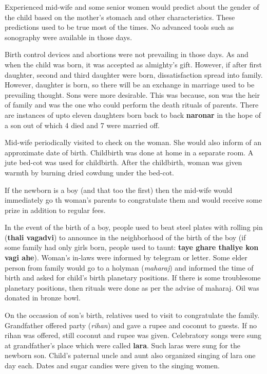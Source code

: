 Experienced mid-wife and some senior women would predict about the gender of the
child based on the mother's stomach and other characteristics. These
predictions used to be true most of the times. No advanced tools such as
sonography were available in those days.

Birth control devices and abortions were not prevailing in those days. As and
when the child was born, it was accepted as almighty's gift. However, if after
first daughter, second and third daughter were born, dissatisfaction spread
into family. However, daughter is born, so there will be an exchange in
marriage used to be prevailing thought. Sons were more desirable. This was
because, son was the heir of family and was the one who could perform the death
rituals of parents. There are instances of upto eleven daughters born back to
back \textbf{naronar} in the hope of a son out of which 4 died and 7 were married off.

Mid-wife periodically visited to check on the woman. She would also inform of an
approximate date of birth. Childbirth was done at home in a separate room. A
jute bed-cot was used for childbirth. After the childbirth, woman was given
warmth by burning dried cowdung under the bed-cot.

If the newborn is a boy (and that too the first) then the mid-wife would
immediately go th woman's parents to congratulate them and would receive some
prize in addition to regular fees.

In the event of the birth of a boy, people used to beat steel plates with
rolling pin (\textbf{thali vagadvi}) to announce in the neighborhood of the
birth of the boy (if some family had only girls born, people used to taunt:
\textbf{taye ghare thaliye kon vagi ahe}). Woman's in-laws were informed by
telegram or letter. Some elder person from family would go to a holyman
(\textit{maharaj}) and informed the time of birth and asked for child's birth
planetary positions. If there is some troublesome planetary positions, then
rituals were done as per the advise of maharaj. Oil was donated in bronze bowl.

On the occassion of son's birth, relatives used to visit to congratulate the
family. Grandfather offered party (\textit{rihan}) and gave a rupee and coconut
to guests. If no rihan was offered, still coconut and rupee was given.
Celebratory songs were sung at grandfather's place which were called
\textbf{lara}. Such laras were sung for the newborn son. Child's paternal uncle
and aunt also organized singing of lara one day each. Dates and sugar candies
were given to the singing women.

